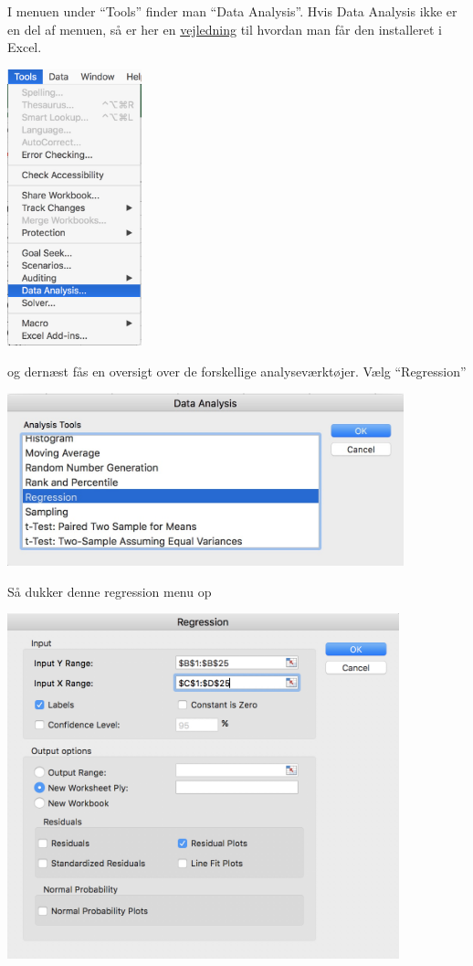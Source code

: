 I menuen under ``Tools'' finder man ``Data Analysis''. Hvis Data Analysis ikke er en del af menuen, så er her en \href{https://support.office.com/en-us/article/Load-the-Analysis-ToolPak-6a63e598-cd6d-42e3-9317-6b40ba1a66b4}{vejledning} til hvordan man får den installeret i Excel.
\begin{center}
\includegraphics[height=8cm]{menu.JPG}
\end{center}
og dernæst fås en oversigt over de forskellige analyseværktøjer. Vælg ``Regression''
\begin{center}
\includegraphics[height=5cm]{analysisTools.JPG}
\end{center}
Så dukker denne regression menu op
\begin{center}
\includegraphics[height=10cm]{regression.JPG}
\end{center}
